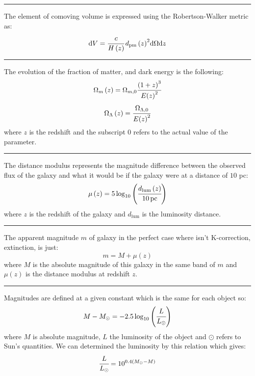 \noindent\rule{\linewidth}{1pt}
%
The element of comoving volume is expressed using the Robertson-Walker metric
as:
%
\begin{equation}
	{\rm{d}}{V}=\cfrac{c}{H\left({z}\right)}\,{d_{\mathrm{pm}}\left({z}\right)}^2{\rm{d}}{\Omega}{\rm{d}}{z}
\end{equation}

\noindent\rule{\linewidth}{1pt}
%
The evolution of the fraction of matter, and dark energy is the following:
%
\begin{equation}
	\Omega_m\left({z}\right)=\Omega_{m,0}
    \cfrac{{\left(1+z\right)}^3}{E{\left({z}\right)}^2}
\end{equation}
%
\begin{equation}
	\Omega_\Lambda\left({z}\right) =
    \cfrac{\Omega_{\Lambda,0}}{E{\left({z}\right)}^2}
\end{equation}
%
where $z$ is the redshift and the subscript 0 refers to the actual value of the
parameter.

\noindent\rule{\linewidth}{1pt}
%
The distance modulus represents the magnitude difference between the observed
flux of the galaxy and what it would be if the galaxy were  at a distance of
$10$ pc:
%
\begin{equation}
	\mu\left(z\right)=5\log_{10}\left(
    \cfrac{d_{\mathrm{lum}}\left({z}\right)}{10\,\mathrm{pc}}
    \right)%
\end{equation}
%
where $z$ is the redshift of the galaxy and $d_{\mathrm{lum}}$ is the
luminosity distance.

\noindent\rule{\linewidth}{1pt}
%
The apparent magnitude $m$ of galaxy in the perfect case where isn't
K-correction, extinction, is just:
%
\begin{equation}\label{eq:magappdm}
	m=M+\mu\left({z}\right)%
\end{equation}
%
where $M$ is the absolute magnitude of this galaxy in the same band of $m$ and
$\mu(z)$ is the distance modulus at redshift $z$.

\noindent\rule{\linewidth}{1pt}
%
Magnitudes are defined at a given constant which is the same for each object
so:
%
\begin{equation}
	M-M_\odot=-2.5\log_{10}\left(\cfrac{L}{L_\odot}\right)%
\end{equation}
%
where $M$ is absolute magnitude, $L$ the luminosity of the object and $\odot$
refers to Sun's quantities. We can determined the luminosity by this relation
which gives:
%
\begin{equation}
	\cfrac{L}{L_\odot}=10^{0.4\left({M_\odot-M}\right)}
\end{equation}

